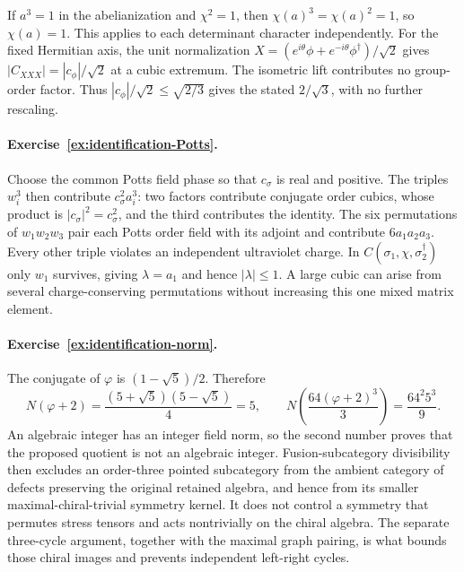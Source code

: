 If $a^3=1$ in the abelianization and $\chi^2=1$, then
$\chi(a)^3=\chi(a)^2=1$, so $\chi(a)=1$. This applies
to each determinant character independently. For the fixed
Hermitian axis, the unit normalization
$X=(e^{i\theta}\phi+e^{-i\theta}\phi^\dagger)/\sqrt2$
gives $|C_{XXX}|=|c_\phi|/\sqrt2$ at a cubic extremum.
The isometric lift contributes no group-order factor.
Thus $|c_\phi|/\sqrt2\leq\sqrt{2/3}$ gives the stated
$2/\sqrt3$, with no further rescaling.



\paragraph{Exercise~\ref{ex:identification-Potts}.}
\label{sol:ex:identification-Potts}
Choose the common Potts field phase so that $c_\sigma$ is real
and positive. The triples $w_i^3$ then contribute $c_\sigma^2a_i^3$:
two factors contribute conjugate order cubics, whose product is
$|c_\sigma|^2=c_\sigma^2$, and the third contributes the identity.
The six permutations of $w_1w_2w_3$ pair each
Potts order field with its adjoint and contribute
$6a_1a_2a_3$. Every other triple violates an independent
ultraviolet charge. In $C(\sigma_1,\chi,\sigma_2^\dagger)$
only $w_1$ survives, giving $\lambda=a_1$ and hence
$|\lambda|\leq1$. A large cubic can arise from several
charge-conserving permutations without increasing this one
mixed matrix element.



\paragraph{Exercise~\ref{ex:identification-norm}.}
\label{sol:ex:identification-norm}
The conjugate of $\varphi$ is $(1-\sqrt5)/2$. Therefore
\[
 N(\varphi+2)=\frac{(5+\sqrt5)(5-\sqrt5)}4=5,
 \qquad
 N\!\left(\frac{64(\varphi+2)^3}{3}\right)
 =\frac{64^2 5^3}{9}.
\]
An algebraic integer has an integer field norm, so the second
number proves that the proposed quotient is not an algebraic
integer. Fusion-subcategory divisibility then excludes an
order-three pointed subcategory from the ambient category of
defects preserving the original retained algebra, and hence
from its smaller maximal-chiral-trivial symmetry kernel.
It does not control a symmetry that permutes stress tensors
and acts nontrivially on the chiral algebra. The separate
three-cycle argument, together with the maximal graph pairing,
is what bounds those chiral images and prevents independent
left-right cycles.



